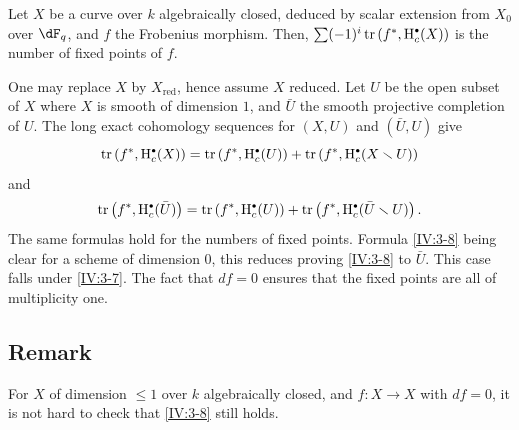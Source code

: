 \begin{corollary_}\label{IV:3-8}
Let $X$ be a curve over $k$ algebraically closed, deduced by scalar
extension from $X_0$ over $\dF_q$, and $f$ the Frobenius morphism. Then,
$\sum (-1)^i \tr\left(f^\ast,\h_c^\bullet(X)\right)$ is the number of fixed
points of $f$.
\end{corollary_}

One may replace $X$ by $X_\text{red}$, hence assume $X$ reduced. Let $U$
be the open subset of $X$ where $X$ is smooth of dimension $1$, and $\bar U$ the
smooth projective completion of $U$. The long exact cohomology
sequences for $(X,U)$ and $(\bar U,U)$ give
\[
  \tr\left(f^\ast,\h_c^\bullet(X)\right) = \tr\left(f^\ast,\h_c^\bullet(U)\right) + \tr\left(f^\ast,\h_c^\bullet(X\setminus U)\right)
\]
and
\[
  \tr\left(f^\ast,\h_c^\bullet(\bar U)\right) = \tr\left(f^\ast,\h_c^\bullet(U)\right) + \tr\left(f^\ast,\h_c^\bullet(\bar U\setminus U)\right) \text{.}
\]
The same formulas hold for the numbers of fixed points. Formula
\ref{IV:3-8} being clear for a scheme of dimension $0$, this reduces
proving \ref{IV:3-8} to $\bar U$. This case falls under \ref{IV:3-7}.
The fact that $d f=0$ ensures that the fixed points are all of
multiplicity one.




\subsection{Remark}\label{IV:3-9}

For $X$ of dimension $\leqslant 1$ over $k$ algebraically closed, and
$f:X\to X$ with $d f=0$, it is not hard to check that
\ref{IV:3-8} still holds.
